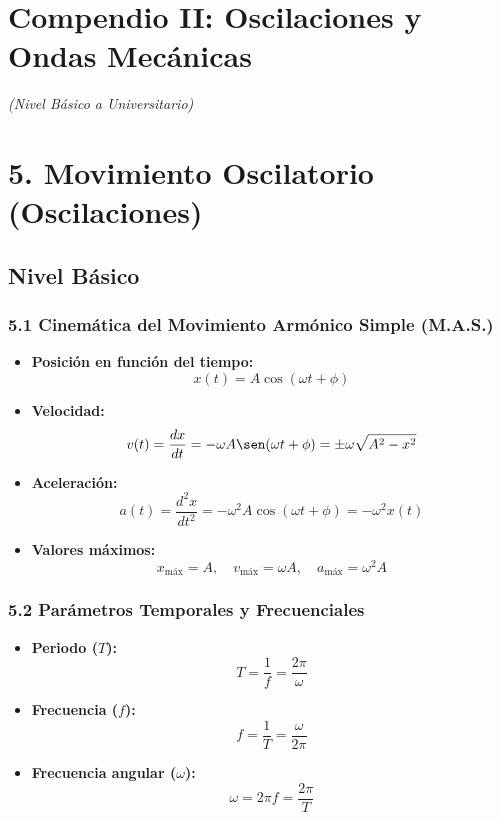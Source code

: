 \documentclass[11pt,a4paper]{article}
\begin{document}
\section*{Compendio II: Oscilaciones y Ondas Mecánicas}

\textit{(Nivel Básico a Universitario)}

\section*{5. Movimiento Oscilatorio (Oscilaciones)}

\subsection*{Nivel Básico}

\subsubsection*{5.1 Cinemática del Movimiento Armónico Simple (M.A.S.)}

\begin{itemize}
  \item \textbf{Posición en función del tiempo:}
  \[
    x(t) = A \cos(\omega t + \phi)
  \]
  \item \textbf{Velocidad:}
  \[
    v(t) = \frac{dx}{dt} = -\omega A \sen(\omega t + \phi) = \pm \omega \sqrt{A^2 - x^2}
  \]
  \item \textbf{Aceleración:}
  \[
    a(t) = \frac{d^2x}{dt^2} = -\omega^2 A \cos(\omega t + \phi) = -\omega^2 x(t)
  \]
  \item \textbf{Valores máximos:}
  \[
    x_{\text{máx}} = A, \quad v_{\text{máx}} = \omega A, \quad a_{\text{máx}} = \omega^2 A
  \]
\end{itemize}

\subsubsection*{5.2 Parámetros Temporales y Frecuenciales}

\begin{itemize}
  \item \textbf{Periodo ($T$):}
  \[
    T = \frac{1}{f} = \frac{2\pi}{\omega}
  \]
  \item \textbf{Frecuencia ($f$):}
  \[
    f = \frac{1}{T} = \frac{\omega}{2\pi}
  \]
  \item \textbf{Frecuencia angular ($\omega$):}
  \[
    \omega = 2\pi f = \frac{2\pi}{T}
  \]
\end{itemize}
\end{document}
